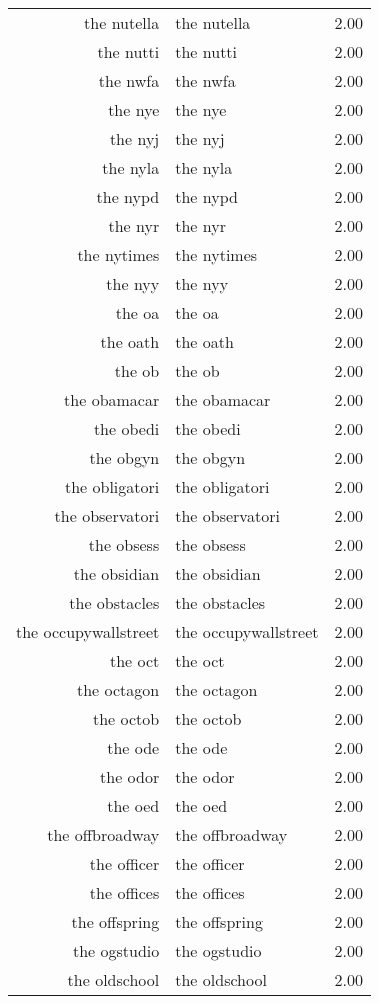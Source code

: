\begin{table}[ht]
\begin{tabular}{rlr}
  the nutella & the nutella & 2.00 \\ 
  the nutti & the nutti & 2.00 \\ 
  the nwfa & the nwfa & 2.00 \\ 
  the nye & the nye & 2.00 \\ 
  the nyj & the nyj & 2.00 \\ 
  the nyla & the nyla & 2.00 \\ 
  the nypd & the nypd & 2.00 \\ 
  the nyr & the nyr & 2.00 \\ 
  the nytimes & the nytimes & 2.00 \\ 
  the nyy & the nyy & 2.00 \\ 
  the oa & the oa & 2.00 \\ 
  the oath & the oath & 2.00 \\ 
  the ob & the ob & 2.00 \\ 
  the obamacar & the obamacar & 2.00 \\ 
  the obedi & the obedi & 2.00 \\ 
  the obgyn & the obgyn & 2.00 \\ 
  the obligatori & the obligatori & 2.00 \\ 
  the observatori & the observatori & 2.00 \\ 
  the obsess & the obsess & 2.00 \\ 
  the obsidian & the obsidian & 2.00 \\ 
  the obstacles & the obstacles & 2.00 \\ 
  the occupywallstreet & the occupywallstreet & 2.00 \\ 
  the oct & the oct & 2.00 \\ 
  the octagon & the octagon & 2.00 \\ 
  the octob & the octob & 2.00 \\ 
  the ode & the ode & 2.00 \\ 
  the odor & the odor & 2.00 \\ 
  the oed & the oed & 2.00 \\ 
  the offbroadway & the offbroadway & 2.00 \\ 
  the officer & the officer & 2.00 \\ 
  the offices & the offices & 2.00 \\ 
  the offspring & the offspring & 2.00 \\ 
  the ogstudio & the ogstudio & 2.00 \\ 
  the oldschool & the oldschool & 2.00 \\ 

\end{tabular}
\end{table}
